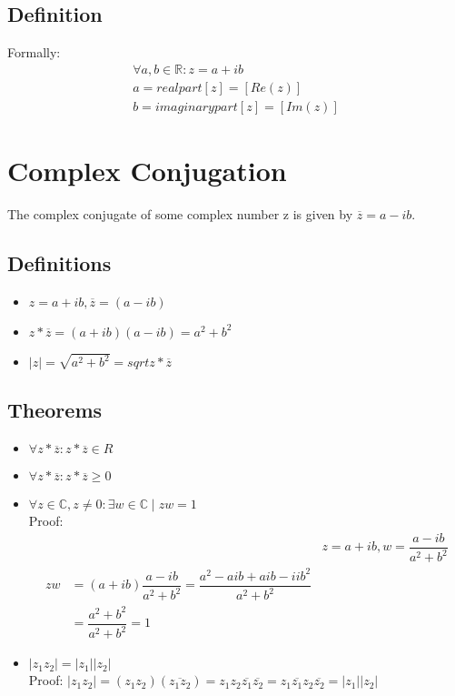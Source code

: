 	\subsection{Definition}
	
		Formally:
		\begin{align}
			\forall a,b \in \mathbb{R}: z = a+ib \\
			a = realpart[z] = [Re(z)]\\
			b = imaginarypart[z] = [Im(z)]
		\end{align}
		
\section{Complex Conjugation}

	The complex conjugate of some complex number z is given by $\overline{z} = a - ib$.
	
	\subsection{Definitions}
	
		\begin{itemize}
			\item $z = a + ib, \overline{z} = (a - ib)$
			\item $z*\overline{z} = (a+ib)(a-ib) = a^2 + b^2$
			\item $|z| = \sqrt{a^2 + b^2} = sqrt{z*\overline{z}}$
		\end{itemize}
		
	\subsection{Theorems}
	
		\begin{itemize}
			\item $\forall z*\overline{z}: z*\overline{z} \in R$
			\item $\forall z*\overline{z}: z*\overline{z} \geq 0$
			\item $\forall z \in \mathbb{C}, z \neq 0: \exists w \in \mathbb{C} \mid zw =1$ \\
					Proof:
					\begin{align}
						&& z = a + ib, w = \dfrac{a-ib}{a^2 + b^2} \\
						zw &= (a + ib)\dfrac{a-ib}{a^2 + b^2} = \dfrac{a^2 - aib + aib - iib^2}{a^2 + b^2} \\
							&= \dfrac{a^2 + b^2}{a^2 + b^2} = 1
					\end{align}
			\item $|z_1z_2| = |z_1||z_2|$\\
					Proof:
					$|z_1z_2| = (z_1z_2)(\overline{z_1z_2}) = z_1z_2\overline{z_1}\overline{z_2} = z_1\overline{z_1}z_2\overline{z_2} = |z_1||z_2|$
		\end{itemize}
	

